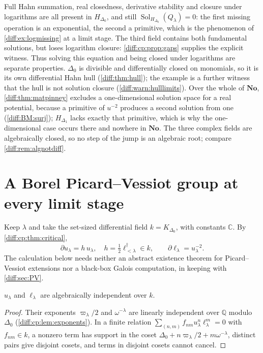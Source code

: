\documentclass[11pt,letterpaper]{article}
\numberwithin{equation}{section}
\theoremstyle{definition}
\theoremstyle{remark}
\newcommand{\No}{\mathbf{No}}
\newcommand{\C}{\mathbb C}
\newcommand{\Q}{\mathbb Q}
\newcommand{\der}{\partial}
\newcommand{\Sol}{\operatorname{Sol}}
\begin{document}
\begin{remark}
\label{diff:cp:rem:workspaces}
Full Hahn summation, real closedness, derivative stability and closure under
logarithms are all present in $H_{\Delta_{0}}$, and still
$\Sol_{H_{\Delta_{0}}}(Q_{\lambda})=0$: the first missing operation is an
exponential, the second a primitive, which is the phenomenon of
\cref{diff:ex:logmissing} at a limit stage. The third field
contains both fundamental solutions, but loses logarithm closure:
\cref{diff:cp:prop:gaps} supplies the explicit witness. Thus
solving this equation and being closed under logarithms are
separate properties. $\Delta_{0}$ is divisible and
differentially closed on monomials, so it is its own differential Hahn hull
(\cref{diff:thm:hull}); the example is a further witness that the hull is not
solution closure (\cref{diff:warn:hulllimits}). Over the whole of $\No$,
\cref{diff:thm:matpinney} excludes a one-dimensional solution space for a real
potential, because a primitive of $u^{-2}$ produces a second solution from one
(\ref{diff:BM:surj}); $H_{\Delta_{1}}$ lacks exactly that primitive, which is
why the one-dimensional case occurs there and nowhere in $\No$. The three
complex fields are algebraically closed, so no step of the jump is an
algebraic root; compare \cref{diff:rem:algnotdiff}.
\end{remark}

\section{A Borel Picard--Vessiot group at every limit stage}
\label{diff:cp:sec:pv}

Keep $\lambda$ and take the set-sized differential field $k=K_{\Delta_{0}}$, with
constants $\C$. By \cref{diff:cp:thm:critical},
\begin{equation}\label{diff:cp:eq:pvder}
 \der u_{\lambda}=h\,u_{\lambda},\quad h=\tfrac12\ell_{<\lambda}^{\dagger}\in k,
 \qquad
 \der\ell_{\lambda}=u_{\lambda}^{-2}.
\end{equation}
The calculation below needs neither an abstract existence theorem for
Picard--Vessiot extensions nor a black-box Galois computation, in keeping with
\cref{diff:sec:PV}.

\begin{lemma}
\label{diff:cp:lem:algind}
$u_{\lambda}$ and $\ell_{\lambda}$ are algebraically independent over $k$.
\end{lemma}
\begin{proof}
Their exponents $\varpi_{\lambda}/2$ and $\omega^{-\lambda}$ are linearly
independent over $\Q$ modulo $\Delta_{0}$ (\cref{diff:cp:lem:exponents}). In a
finite relation $\sum_{(n,m)}f_{nm}u_{\lambda}^{n}\ell_{\lambda}^{m}=0$ with
$f_{nm}\in k$, a nonzero term has support in the coset
$\Delta_{0}+n\varpi_{\lambda}/2+m\omega^{-\lambda}$, distinct pairs give
disjoint cosets, and terms in disjoint cosets cannot cancel.
\end{proof}
\end{document}
